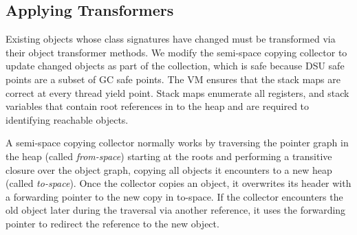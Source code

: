 
\subsection{Applying Transformers}
\label{sec:xformers}


Existing objects whose class signatures have changed must be 
transformed via their object transformer methods.  We modify the \JikesRVM{}
semi-space copying collector \cite{BCM:04} to 
update changed objects as part of the collection, which is
safe because DSU safe points are a subset of GC safe points.  The VM
ensures that the stack maps are correct at every thread yield point.
Stack maps enumerate all registers, and stack variables that contain
root references in to the heap and are required to identifying reachable
objects.

A semi-space copying collector \cite{Cheney:70} normally works by traversing the
pointer graph in the heap (called \emph{from-space}) starting at the
roots and performing a transitive closure over the object graph, copying
all objects it encounters to a new heap (called \emph{to-space}).
Once the collector copies an object, it overwrites its header with a
forwarding pointer to the new copy in to-space.  If the collector
encounters the old object later during the traversal via another
reference, it uses the forwarding pointer to redirect the reference to
the new object.

